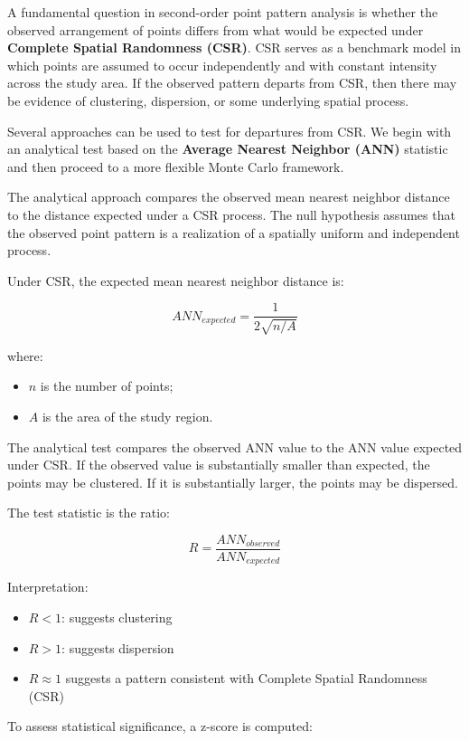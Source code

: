 \documentclass[
  letterpaper,
]{book}
\providecommand{\tightlist}{%
  \setlength{\itemsep}{0pt}\setlength{\parskip}{0pt}}
\begin{document}
A fundamental question in second-order point pattern analysis is whether
the observed arrangement of points differs from what would be expected
under \textbf{Complete Spatial Randomness (CSR)}. CSR serves as a
benchmark model in which points are assumed to occur independently and
with constant intensity across the study area. If the observed pattern
departs from CSR, then there may be evidence of clustering, dispersion,
or some underlying spatial process.

Several approaches can be used to test for departures from CSR. We begin
with an analytical test based on the \textbf{Average Nearest Neighbor
(ANN)} statistic and then proceed to a more flexible Monte Carlo
framework.

The analytical approach compares the observed mean nearest neighbor
distance to the distance expected under a CSR process. The null
hypothesis assumes that the observed point pattern is a realization of a
spatially uniform and independent process.

Under CSR, the expected mean nearest neighbor distance is:

\[
ANN_{expected}=\dfrac{1}{2\sqrt{n/A}}
\]

where:

\begin{itemize}
\tightlist
\item
  \(n\) is the number of points;
\item
  \(A\) is the area of the study region.
\end{itemize}

The analytical test compares the observed ANN value to the ANN value
expected under CSR. If the observed value is substantially smaller than
expected, the points may be clustered. If it is substantially larger,
the points may be dispersed.

The test statistic is the ratio:

\[
R = \frac{ANN_{observed}}{ANN_{expected}}
\]

Interpretation:

\begin{itemize}
\tightlist
\item
  \(R < 1\): suggests clustering
\item
  \(R > 1\): suggests dispersion
\item
  \(R \approx 1\) suggests a pattern consistent with Complete Spatial
  Randomness (CSR)
\end{itemize}

To assess statistical significance, a z-score is computed:
\end{document}
